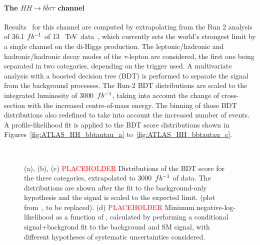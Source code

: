 %
\paragraph{The $HH \rightarrow b\bar{b}\tau\tau$ channel}

Results~\cite{ATLASHHPUBnote} for this channel are computed by extrapolating from the Run 2 analysis of 36.1 $fb^{-1}$ of 13~$~\text{TeV}$ data~\cite{ATLASrun2HHbbtautau}, which currently sets the world's strongest limit by a single channel on the di-Higgs production. 
The leptonic/hadronic and hadronic/hadronic decay modes of the $\tau$-lepton are considered, the first one being separated in two categories, depending on the trigger used. A multivariate analysis with a boosted decision tree (BDT) is performed to separate the signal from the background processes. The Run-2 BDT distributions are scaled to the integrated luminosity of 3000~$fb^{-1}$, taking into account the change of cross-section with the increased centre-of-mass energy. The binning of those BDT distributions also redefined to take into account the increased number of events.
A profile-likelihood fit is applied to the BDT score distributions shown in Figures~\ref{fig:ATLAS_HH_bbtautau_a} to~\ref{fig:ATLAS_HH_bbtautau_c}. 


\begin{figure}[!htb]
\centering 
{} 
\\
\caption{(a), (b), (c) \textcolor{red}{PLACEHOLDER} Distributions of the BDT score for the three categories, extrapolated to 3000~$fb^{-1}$ of data. The distributions are shown after the fit to the background-only hypothesis and the signal is scaled to the expected limit.  (plot from~\cite{ATLASrun2HHbbtautau}, to be replaced). (d) \textcolor{red}{PLACEHOLDER} Minimum negative-log-likelihood as a function of \kl, calculated by performing a conditional signal+backgrond fit to the background and SM signal, with different hypotheses of systematic uncertainties considered.} 
\label{fig:ATLAS_HH_bbtautau} 
\end{figure}

